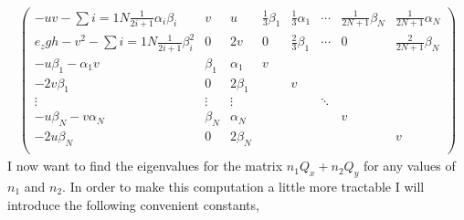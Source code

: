 \begin{gather}
\begin{pmatrix}
      -uv - \sum{i = 1}{N}{\frac{1}{2i + 1} \alpha_i \beta_i}        & v       & u         & \frac{1}{3} \beta_{1} & \frac{1}{3} \alpha_{1} & \cdots & \frac{1}{2N+1} \beta_N & \frac{1}{2N+1} \alpha_N  \\
      e_{z} g h - v^{2} - \sum{i = 1}{N}{\frac{1}{2i + 1} \beta_i^2} & 0       & 2v        & 0                     & \frac{2}{3} \beta_1    & \cdots & 0                      & \frac{2}{2N + 1} \beta_N \\
      - u\beta_1 - \alpha_1 v                                        & \beta_1 & \alpha_1  & v                     &                        &        &                        &                          \\
      -2 v \beta_1                                                   & 0       & 2 \beta_1 &                       & v                      &        &                        &                          \\
      \vdots                                                         & \vdots  & \vdots    &                       &                        & \ddots &                        &                          \\
      -u \beta_N - v \alpha_N                                        & \beta_N & \alpha_N  &                       &                        &        & v                      &                          \\
      -2 u \beta_N                                                   & 0       & 2 \beta_N &                       &                        &        &                        & v                        \\
    \end{pmatrix}
  \end{gather}
  I now want to find the eigenvalues for the matrix \(n_1 Q_x + n_2 Q_y\) for any values
  of \(n_1\) and \(n_2\).
  In order to make this computation a little more tractable I will introduce the
  following convenient constants,
